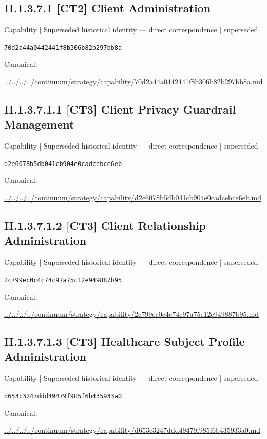 \documentclass[10pt,a4paper]{article}
\begin{document}
\subsection*{II.1.3.7.1 [CT2] Client Administration}
{\small Capability | Superseded historical identity — direct correspondence | superseded}\par
\texttt{70d2a44a0442441f8b306b82b297bb8a}\par
Canonical: \par
{\footnotesize\url{../../../../continuum/strategy/capability/70d2a44a0442441f8b306b82b297bb8a.md}}\par
\subsection*{II.1.3.7.1.1 [CT3] Client Privacy Guardrail Management}
{\small Capability | Superseded historical identity — direct correspondence | superseded}\par
\texttt{d2e6078b5db041cb904e0cadcebce6eb}\par
Canonical: \par
{\footnotesize\url{../../../../continuum/strategy/capability/d2e6078b5db041cb904e0cadcebce6eb.md}}\par
\subsection*{II.1.3.7.1.2 [CT3] Client Relationship Administration}
{\small Capability | Superseded historical identity — direct correspondence | superseded}\par
\texttt{2c799ec0c4c74c97a75c12e949887b95}\par
Canonical: \par
{\footnotesize\url{../../../../continuum/strategy/capability/2c799ec0c4c74c97a75c12e949887b95.md}}\par
\subsection*{II.1.3.7.1.3 [CT3] Healthcare Subject Profile Administration}
{\small Capability | Superseded historical identity — direct correspondence | superseded}\par
\texttt{d653c3247ddd49479f985f6b435933a0}\par
Canonical: \par
{\footnotesize\url{../../../../continuum/strategy/capability/d653c3247ddd49479f985f6b435933a0.md}}\par
\end{document}
